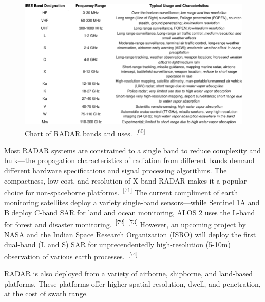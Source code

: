 \documentclass{article}
\begin{document}

\begin{figure}
    \centering
    \includegraphics[width=1\linewidth]{images/radar-bands.png}
    \caption{Chart of RADAR bands and uses.~\textsuperscript{[60]}}
    \label{figure19}
\end{figure}


\par{Most RADAR systems are constrained to a single band to reduce complexity and bulk---the propagation characteristics of radiation from different bands demand different hardware specifications and signal processing algorithms. The compactness, low-cost, and resolution of X-band RADAR makes it a popular choice for non-spaceborne platforms.~\textsuperscript{[71]} The current compliment of earth monitoring satellites deploy a variety single-band sensors---while Sentinel 1A and B deploy C-band SAR for land and ocean monitoring, ALOS 2 uses the L-band for forest and disaster monitoring.~\textsuperscript{[72]}~\textsuperscript{[73]} However, an upcoming project by NASA and the Indian Space Research Organization (ISRO) will deploy the first dual-band (L and S) SAR for unprecendentedly high-resolution (5-10m) observation of various earth processes.~\textsuperscript{[74]}}


\par{RADAR is also deployed from a variety of airborne, shipborne, and land-based platforms. These platforms offer higher spatial resolution, dwell, and penetration, at the cost of swath range.}

\end{document}
